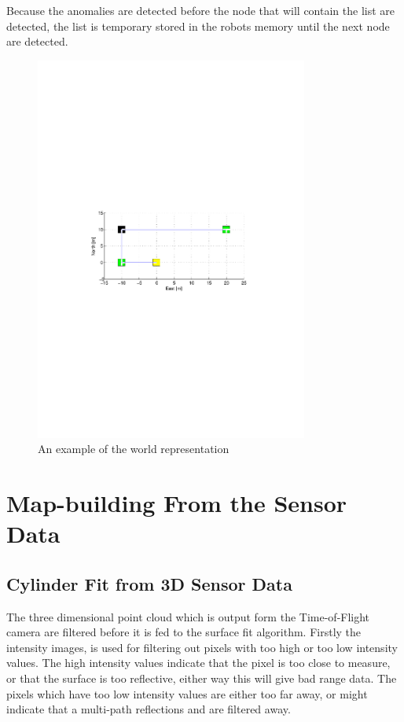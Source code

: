 Because the anomalies are detected before the node that will contain the list are
detected, the list is temporary stored in the robots memory until the next node are
detected. 
\begin{figure}[htbp]
    \centering
    \includegraphics[width=0.8\textwidth]{pics/worldrepresentation}
    \caption{An example of the world representation}
    \label{chap5:fig-worldrepresentation}
\end{figure}


\section{Map-building From the Sensor Data}


\subsection{Cylinder Fit from 3D Sensor Data}
The three dimensional point cloud which is output form the Time-of-Flight camera are
filtered before it is fed to the surface fit algorithm. Firstly the intensity images, is
used for filtering out pixels with too high or too low intensity values. The high
intensity values indicate that the pixel is too close to measure, or that the surface is
too reflective, either way this will give bad range data. The pixels which have too low
intensity values are either too far away, or might indicate that a multi-path reflections
and are filtered away. 

